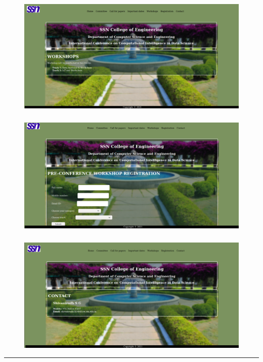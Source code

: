 \documentclass[12pt,letterpaper]{article}
\begin{document}
\newpage
\subsubsection*{}
\begin{figure}[h]
    \centering
    \includegraphics[width = \textwidth]{Pics/Workshops.png}
\end{figure}

\newpage
\subsubsection*{}
\begin{figure}[h]
    \centering
    \includegraphics[width = \textwidth]{Pics/Registration.png}
\end{figure}

\newpage
\subsubsection*{}
\begin{figure}[h]
    \centering
    \includegraphics[width = \textwidth]{Pics/Contact.png}
\end{figure}
\hrule
\end{document}
